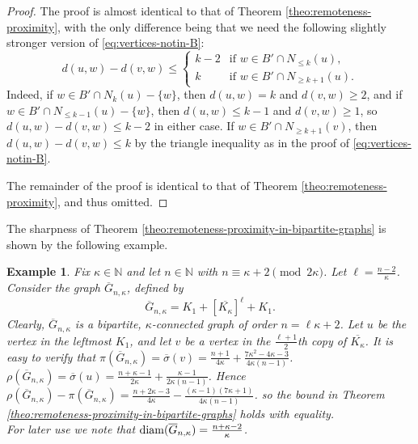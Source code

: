 \documentclass[a4paper,11pt]{article}
\newtheorem{example}{Example}[section]
\begin{document}
\begin{proof}

The proof is almost identical to that of Theorem \ref{theo:remoteness-proximity},
with the only difference being that we need the
following slightly stronger version of \eqref{eq:vertices-notin-B}:
\begin{equation} \label{eq:vertices-notin-B-bipartite} 
d(u,w) - d(v,w) \leq \left\{ \begin{array}{cl}
k-2 & \textrm{if $w \in B' \cap N_{\leq k}(u)$,} \\
k & \textrm{if $w \in B' \cap N_{\geq k+1}(u)$.}
\end{array} \right. 
\end{equation}
Indeed, if $w \in B' \cap N_{k}(u)-\{w\}$, then $d(u,w) = k$ and $d(v,w) \geq 2$, 
and if $w \in B' \cap N_{\leq k-1}(u)-\{w\}$, then $d(u,w) \leq k-1$ and $d(v,w) \geq 1$,
so $d(u,w) - d(v,w) \leq k-2$ in either case. If $w \in B' \cap N_{\geq k+1}(v)$, then 
$d(u,w) - d(v,w) \leq k$ by the triangle inequality as in the proof of \eqref{eq:vertices-notin-B}.

The remainder of the proof is identical to that of Theorem \ref{theo:remoteness-proximity}, 
and thus omitted.
\end{proof}


The sharpness of Theorem \ref{theo:remoteness-proximity-in-bipartite-graphs} is shown by the following
example. 

\begin{example}   \label{ex:rho-pi-connectivity-bipartite}
Fix $\kappa \in \mathbb{N}$ and let $n \in \mathbb{N}$ with $n \equiv \kappa+2 \pmod{2\kappa}$. 
Let $\ell = \frac{n-2}{\kappa}$. Consider the graph $\overline{G}_{n, \kappa}$, defined by 
\[ \overline{G}_{n,\kappa} = K_1 + [\overline{K_{\kappa}}]^{\ell}  + K_1. \]
Clearly, $\overline{G}_{n,\kappa}$ is a bipartite, $\kappa$-connected graph of order 
$n=\ell \kappa+2$. 
Let $u$ be the vertex in the leftmost $K_1$, and let $v$ be a vertex in the $\frac{\ell+1}{2}$th 
copy of $\overline{K_{\kappa}}$. It is easy to verify that  
$\pi(\overline{G}_{n,\kappa}) =\overline{\sigma}(v) 
   = \frac{n+1}{4\kappa} + \frac{7\kappa^2-4\kappa-3}{4\kappa (n-1)}$.
$\rho(\overline{G}_{n,\kappa}) =\overline{\sigma}(u) 
      = \frac{n+\kappa-1}{2\kappa} + \frac{\kappa-1}{2\kappa(n-1)}$.
Hence 
$\rho(\overline{G}_{n,\kappa}) - \pi(\overline{G}_{n,\kappa}) 
    = \frac{n+2\kappa-3}{4\kappa}  
               - \frac{(\kappa-1)(7\kappa+1)}{4\kappa (n-1)}$. 
so the bound in Theorem \ref{theo:remoteness-proximity-in-bipartite-graphs} holds with equality. 
\\
For later use  we note that ${\rm diam}(\overline{G}_{n,\kappa})=\frac{n+\kappa-2}{\kappa}$. 
\end{example}
\end{document}
